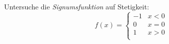 \begin{exercise}
  Untersuche die \emph{Signumsfunktion} auf Stetigkeit:
  \begin{equation*}
    f(x)
    =
    \begin{cases}
      -1 & x < 0 \\
      0  & x = 0 \\
      1  & x > 0 \\
    \end{cases}
  \end{equation*}
\end{exercise}
